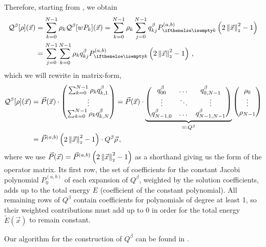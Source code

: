 Therefore, starting from , we obtain
\begin{align*}
  \mathcal{Q}^\beta[\rho](\vec{x}) & = \sum_{k=0}^{N-1} \rho_k \mathcal{Q}^\beta[wP_k](\vec{x}) = \sum_{k=0}^{N-1} \rho_k \sum_{j=0}^{N-1} q^{\beta}_{kj} \jacobi{x} \\
                                   & = \sum_{j=0}^{N-1} \sum_{k=0}^{N-1} \rho_k q^{\beta}_{kj} \jacobi{x}\,,
\end{align*}
which we will rewrite in matrix-form,
\begin{align*}
  \mathcal{Q}^\beta[\rho](\vec{x}) & = \vec{P}(\vec{x}) \cdot
  \begin{pmatrix}
    \sum_{k=0}^{N-1} \rho_k q^{\beta}_{k,1} \\
    \vdots                                  \\
    \sum_{k=0}^{N-1} \rho_k q^{\beta}_{k,N}
  \end{pmatrix} = \vec{P}(\vec{x}) \cdot
  \underbrace{
    \begin{pmatrix}
      q^{\beta}_{00}    & \dots  & q^{\beta}_{0,N-1}   \\
      \vdots            & \ddots & \vdots              \\
      q^{\beta}_{N-1,0} & \dots  & q^{\beta}_{N-1,N-1} \\
    \end{pmatrix}
  }_{=: Q^\beta}
  \begin{pmatrix}
    \rho_0 \\
    \vdots \\
    \rho_{N-1}
  \end{pmatrix}                                                                 \\
                                   & = \vec{P}^{(a, b)}\left(2 \left\lVert\vec{x}\right\rVert_{\scriptscriptstyle 2}^2 - 1\right) \cdot Q^\beta \vec{\rho}\,,
\end{align*}
where we use $\vec{P}(\vec{x}) = \vec{P}^{(a, b)}\left(2 \left\lVert\vec{x}\right\rVert_{\scriptscriptstyle 2}^2 - 1\right)$ as a shorthand giving us the form of the operator matrix.
Its first row, the set of coefficients for the constant Jacobi polynomial $P_0^{(a,b)}$ of each expansion of $Q^\beta$, weighted by the solution coefficients, adds up to the total energy $E$ (coefficient of the constant polynomial).
All remaining rows of $Q^\beta$ contain coefficients for polynomials of degree at least 1, so their weighted contributions must add up to 0 in order for the total energy $\tilde{E}(\vec{x})$ to remain constant.

Our algorithm for the construction of $Q^\beta$ can be found in .

